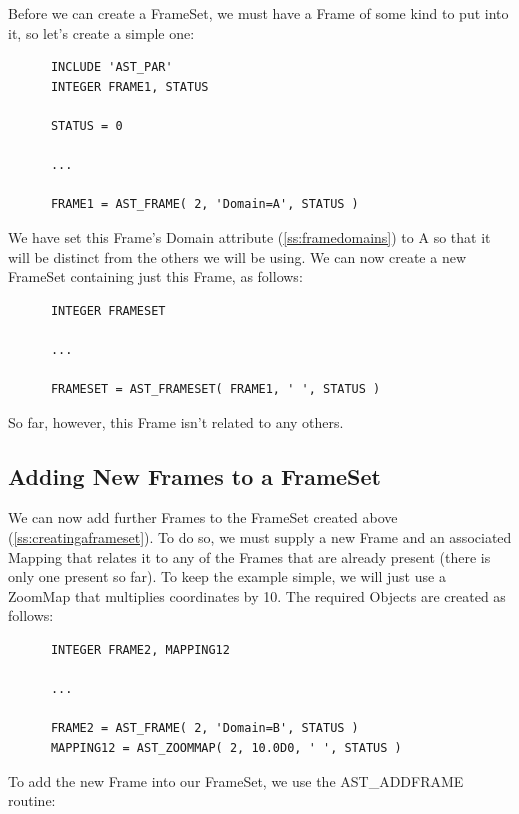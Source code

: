 \documentclass[twoside,11pt]{article}
\newcommand{\htmlref}[2]{#1}
\newcommand{\secref}[1]{\S\ref{#1}}
\renewcommand{\secref}[1]{\ref{#1}}
\begin{document}
Before we can create a \htmlref{FrameSet}{FrameSet}, we must have a \htmlref{Frame}{Frame} of some kind to
put into it, so let's create a simple one:

\small
\begin{verbatim}
      INCLUDE 'AST_PAR'
      INTEGER FRAME1, STATUS

      STATUS = 0

      ...

      FRAME1 = AST_FRAME( 2, 'Domain=A', STATUS )
\end{verbatim}
\normalsize

We have set this Frame's \htmlref{Domain}{Domain} attribute (\secref{ss:framedomains}) to
A so that it will be distinct from the others we will be using. We can
now create a new FrameSet containing just this Frame, as follows:

\small
\begin{verbatim}
      INTEGER FRAMESET

      ...

      FRAMESET = AST_FRAMESET( FRAME1, ' ', STATUS )
\end{verbatim}
\normalsize

So far, however, this Frame isn't related to any others.

\subsection{\label{ss:addingframes}Adding New Frames to a FrameSet}

We can now add further Frames to the \htmlref{FrameSet}{FrameSet} created above
(\secref{ss:creatingaframeset}). To do so, we must supply a new \htmlref{Frame}{Frame}
and an associated \htmlref{Mapping}{Mapping} that relates it to any of the Frames that
are already present (there is only one present so far).  To keep the
example simple, we will just use a \htmlref{ZoomMap}{ZoomMap} that multiplies coordinates
by 10. The required Objects are created as follows:

\small
\begin{verbatim}
      INTEGER FRAME2, MAPPING12

      ...

      FRAME2 = AST_FRAME( 2, 'Domain=B', STATUS )
      MAPPING12 = AST_ZOOMMAP( 2, 10.0D0, ' ', STATUS )
\end{verbatim}
\normalsize

To add the new Frame into our FrameSet, we use the \htmlref{AST\_ADDFRAME}{AST_ADDFRAME}
routine:
\end{document}
